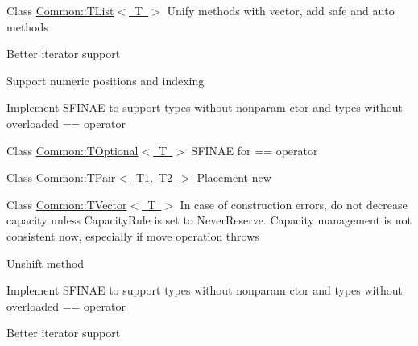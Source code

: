 
\begin{DoxyRefList}
\item[Class \mbox{\hyperlink{class_common_1_1_t_list}{Common\+::TList$<$ T $>$}} ]\label{todo__todo000001}%
%
Unify methods with vector, add safe and auto methods

\label{todo__todo000002}%
%
Better iterator support

\label{todo__todo000003}%
%
Support numeric positions and indexing

\label{todo__todo000004}%
%
Implement SFINAE to support types without nonparam ctor and types without overloaded == operator 
\item[Class \mbox{\hyperlink{class_common_1_1_t_optional}{Common\+::TOptional$<$ T $>$}} ]\label{todo__todo000005}%
%
SFINAE for == operator  
\item[Class \mbox{\hyperlink{class_common_1_1_t_pair}{Common\+::TPair$<$ T1, T2 $>$}} ]\label{todo__todo000006}%
%
Placement new 
\item[Class \mbox{\hyperlink{class_common_1_1_t_vector}{Common\+::TVector$<$ T $>$}} ]\label{todo__todo000007}%
%
In case of construction errors, do not decrease capacity unless Capacity\+Rule is set to Never\+Reserve. Capacity management is not consistent now, especially if move operation throws

\label{todo__todo000008}%
%
Unshift method

\label{todo__todo000009}%
%
Implement SFINAE to support types without nonparam ctor and types without overloaded == operator

\label{todo__todo000010}%
%
Better iterator support
\end{DoxyRefList}
